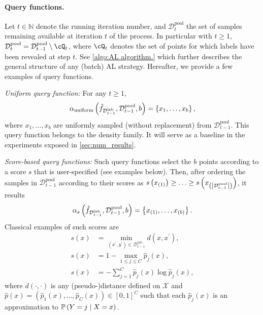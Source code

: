 \documentclass[twoside]{article}
\theoremstyle{definition}
\theoremstyle{remark}
\newcommand{\Dlab}{\mathcal{D}^{\mathrm{lab}}}
\newcommand{\Dpool}{\mathcal{D}^{\mathrm{pool}}}
\begin{document}
\paragraph{Query functions.}
%
Let $t\in\mathbb{N}$ denote the running iteration number, and $\Dpool_t$ the set of samples remaining available at iteration $t$ of the process. In particular with $t\geq 1$, $\Dpool_t = \Dpool_{t-1} \setminus \cQ_{t} $, where $\cQ_{t}$ denotes the set of points for which labels have been revealed at step $t$.  
%
See \cref{algo:AL algorithm.} which further describes the general structure of any (batch) AL strategy.
Hereafter, we provide a few examples of query functions.

\emph{Uniform query function:} For any $t\geq 1$,
\begin{align*}
    \alpha_{\text{uniform}}\pa{\hat{f}_{\Dlab_{t-1}}, \Dpool_{t-1}, b} = \set{x_1, \ldots, x_b} , 
\end{align*}
%
where $x_1,\ldots,x_b$ are uniformly sampled (without replacement) from $\Dpool_{t-1}$.
%    
This query function belongs to the density family. It will serve as a baseline in the experiments exposed in \cref{sec:num_results}.

\emph{Score-based query functions:} 
%
Such query functions select the $b$ points according to a score $s$ that is user-specified (see examples below). 
%
Then, after ordering the samples in $\Dpool_{t-1}$ according to their scores as $s\pa{x_{(1)}} \geq \ldots \geq s\pa{x_{\pa{\abs{\Dpool_{t-1} }}}}$, it results
\begin{align*}
    \alpha_{s}\pa{\hat{f}_{\Dlab_{t-1}}, \Dpool_{t-1}, b} = \set{x_{\pa{1}}, \ldots, x_{\pa{b}}}.
\end{align*}   
%
Classical examples of such scores are 
\begin{align*}
s(x) &= \min_{(x^\prime, y^\prime) \in \Dlab_{t-1}}d(x, x^\prime),\tag{Diversity}\\
s(x) &= 1 - \max_{1\leq j\leq C} \hat{p}_j(x), \tag{Uncertainty}\\
s(x) &= - \sum_{j=1}^C \hat{p}_j(x) \log \hat{p}_j(x), \tag{Entropy}
\end{align*}
where $d(\cdot,\cdot)$ is any (pseudo-)distance defined on $\mathcal{X}$ and $\hat p(x) = (\hat p_1(x),\ldots,\hat p_C(x)) \in [0,1]^C$ such that each $\hat p_j(x) $ is an approximation to $\mathbb{P}\left(Y=j\mid X=x\right)$.
\end{document}
